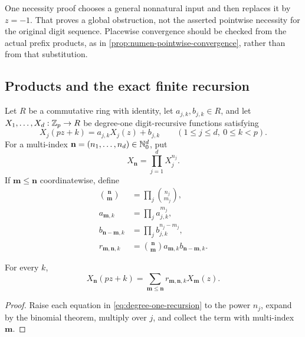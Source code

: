 \begin{sourceissue}
One necessity proof chooses a general nonnatural input and then replaces it
by $z=-1$.  That proves a global obstruction, not the asserted pointwise
necessity for the original digit sequence.  Placewise convergence should be
checked from the actual prefix products, as in
\cref{prop:numen-pointwise-convergence}, rather than from that substitution.
\end{sourceissue}

\subsection{Products and the exact finite recursion}

Let $R$ be a commutative ring with identity, let
$a_{j,k},b_{j,k}\in R$, and let
$X_1,\ldots,X_d:\mathbb Z_p\to R$ be degree-one digit-recursive functions
satisfying
\begin{equation}
\label{eq:degree-one-recursion}
 X_j(pz+k)=a_{j,k}X_j(z)+b_{j,k}
 \qquad(1\leq j\leq d,\ 0\leq k<p).
\end{equation}
For a multi-index $\mathbf n=(n_1,\ldots,n_d)\in\mathbb N_0^d$, put
\[
 X_{\mathbf n}=\prod_{j=1}^dX_j^{n_j}.
\]
If $\mathbf m\leq\mathbf n$ coordinatewise, define
\begin{align}
 \binom{\mathbf n}{\mathbf m}&=\prod_j\binom{n_j}{m_j},\\
 a_{\mathbf m,k}&=\prod_ja_{j,k}^{m_j},\\
 b_{\mathbf n-\mathbf m,k}&=\prod_jb_{j,k}^{n_j-m_j},\\
 r_{\mathbf m,\mathbf n,k}
 &=\binom{\mathbf n}{\mathbf m}
   a_{\mathbf m,k}b_{\mathbf n-\mathbf m,k}.
\end{align}

\begin{proposition}
\label{prop:product-branch-recursion}
For every $k$,
\begin{equation}
\label{eq:product-branch-recursion}
 X_{\mathbf n}(pz+k)
 =\sum_{\mathbf m\leq\mathbf n}
 r_{\mathbf m,\mathbf n,k}X_{\mathbf m}(z).
\end{equation}
\end{proposition}

\begin{proof}
Raise each equation in \cref{eq:degree-one-recursion} to the power $n_j$,
expand by the binomial theorem, multiply over $j$, and collect the term with
multi-index $\mathbf m$.
\end{proof}

